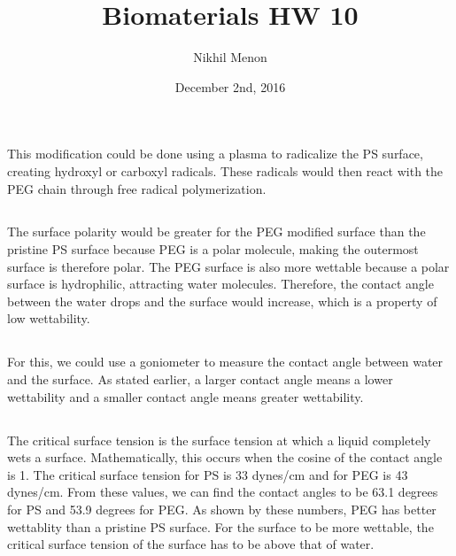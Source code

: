 \documentclass{article}
\title{Biomaterials HW 10}
\author{Nikhil Menon}
\date{December 2nd, 2016}
\begin{document}
\maketitle

\section{}
\subsection{}
This modification could be done using a plasma to radicalize the PS surface, creating hydroxyl or carboxyl radicals. These radicals would then react with the PEG chain through free radical polymerization.

\subsection{}
The surface polarity would be greater for the PEG modified surface than the pristine PS surface because PEG is a polar molecule, making the outermost surface is therefore polar. The PEG surface is also more wettable because a polar surface is hydrophilic, attracting water molecules. Therefore, the contact angle between the water drops and the surface would increase, which is a property of low wettability.

\subsection{}
For this, we could use a goniometer to measure the contact angle between water and the surface. As stated earlier, a larger contact angle means a lower wettability and a smaller contact angle means greater wettability.

\subsection{}
The critical surface tension is the surface tension at which a liquid completely wets a surface. Mathematically, this occurs when the cosine of the contact angle is 1. The critical surface tension for PS is 33 dynes/cm and for PEG is 43 dynes/cm. From these values, we can find the contact angles to be 63.1 degrees for PS and 53.9 degrees for  PEG. As shown by these numbers, PEG has better wettablity than a pristine PS surface. For the surface to be more wettable, the critical surface tension of the surface has to be above that of water.
\end{document}
